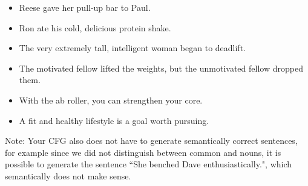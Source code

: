 \documentclass{article}
\begin{document}
\begin{tcolorbox}[enhanced,interior style={top color=Dandelion!20,bottom color=Dandelion!30}]
\begin{itemize}
\begin{itemize}
                \item Reese gave her pull-up bar to Paul.
                \item Ron ate his cold, delicious protein shake.
                \item The very extremely tall, intelligent woman began to deadlift.
                \item The motivated fellow lifted the weights, but the unmotivated fellow dropped them.
                \item With the ab roller, you can strengthen your core.
                \item A fit and healthy lifestyle is a goal worth pursuing.
            \end{itemize}

            Note: Your CFG also does not have to generate semantically correct sentences, for example since we did not distinguish between common and nouns, it is possible to generate the sentence ``She benched Dave enthusiastically.", which semantically does not make sense.
        \end{itemize}
\end{tcolorbox}






\end{document}
